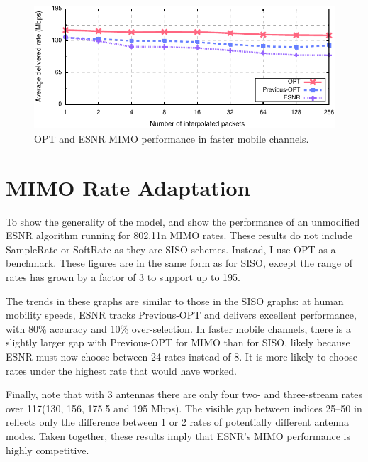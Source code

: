 \begin{figure}[ht]
      \centering
      \includegraphics[width=\textwidth]{figures/rate/mimo_rate_skip.pdf}
      \caption[OPT and ESNR MIMO performance in fast mobile channels]{\label{fig:mimo_eff_snr_speedup} OPT and ESNR MIMO performance in faster mobile channels.}
\end{figure}

\section{MIMO Rate Adaptation}
To show the generality of the model,  and  show the performance of an unmodified ESNR algorithm running for 802.11n MIMO rates. These results do not include SampleRate or SoftRate as they are SISO schemes. Instead, I use OPT as a benchmark.
These figures are in the same form as for SISO, except the range of rates has grown by a factor of 3 to support up to 195\Mbps. 

The trends in these graphs are similar to those in the SISO graphs: at human mobility speeds, ESNR tracks Previous-OPT and delivers excellent performance, with 80\% accuracy and 10\% over-selection. In faster mobile channels, there is a slightly larger gap with Previous-OPT for MIMO than for SISO, likely because ESNR must now choose between 24 rates instead of 8. It is more likely to choose rates under the highest rate that would have worked. 

Finally, note that with 3 antennas there are only four two- and three-stream rates over 117\Mbps (130, 156, 175.5 and 195 Mbps). The visible gap between indices 25--50 in  reflects only the difference between 1 or 2 rates of potentially different antenna modes. Taken together, these results imply that ESNR's MIMO performance is highly competitive.


